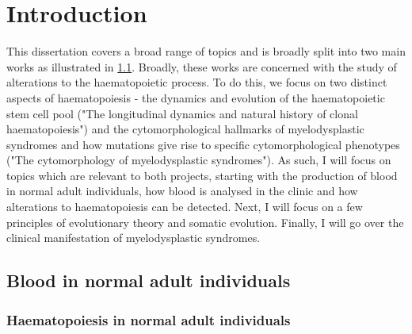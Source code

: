 \chapter{Introduction}

This dissertation covers a broad range of topics and is broadly split into two main works as illustrated in \ref{fig:overview}. Broadly, these works are concerned with the study of alterations to the haematopoietic process. To do this, we focus on two distinct aspects of haematopoiesis - the dynamics and evolution of the haematopoietic stem cell pool ("The longitudinal dynamics and natural history of clonal haematopoiesis") and the cytomorphological hallmarks of myelodysplastic syndromes and how mutations give rise to specific cytomorphological phenotypes ("The cytomorphology of myelodysplastic syndromes"). As such, I will focus on topics which are relevant to both projects, starting with the production of blood in normal adult individuals, how blood is analysed in the clinic and how alterations to haematopoiesis can be detected. Next, I will focus on a few principles of evolutionary theory and somatic evolution. Finally, I will go over the clinical manifestation of myelodysplastic syndromes.

\begin{figure}
  \label{fig:overview}
\end{figure}

\section{Blood in normal adult individuals}

\subsection{Haematopoiesis in normal adult individuals}

